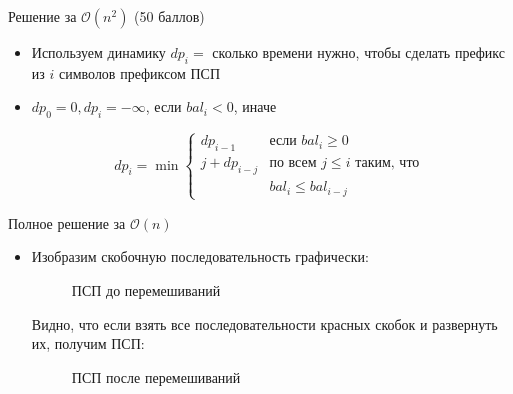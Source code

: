 \begin{frame}{Решение за $\mathcal{O}(n^2)$ (50 баллов)}
  \begin{itemize}
  \item Используем динамику $dp_i=$ сколько времени нужно, чтобы сделать префикс из $i$ символов префиксом ПСП
  \item $dp_0 = 0, dp_i = -\infty$, если $bal_i < 0$, иначе

    \[ dp_i = \min \left\{
    \begin{array}{ll}
      dp_{i-1} & \textrm{если } bal_i \geq 0 \\
      j + dp_{i-j} & \textrm{по всем } j \leq i \textrm{ таким, что } \\
      & bal_i \leq bal_{i-j}
    \end{array} \right. \]
  \end{itemize}
\end{frame}

\begin{frame}{Полное решение за $\mathcal{O}(n)$}
  \begin{itemize}

  \item Изобразим скобочную последовательность графически:

    \begin{figure}[htb]
      \centering
      \caption{ПСП до перемешиваний}
    \end{figure}

    Видно, что если взять все последовательности красных скобок и развернуть их, получим ПСП:
    \begin{figure}[htb]
      \centering
      \caption{ПСП после перемешиваний}
    \end{figure}
  \end{itemize}
\end{frame} 

